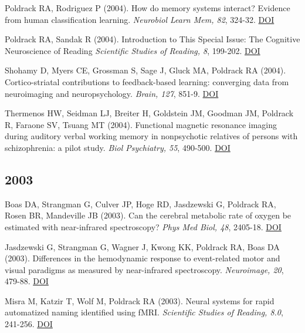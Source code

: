 \documentclass[10pt, letterpaper]{article}
\begin{document}
Poldrack RA, Rodriguez P (2004). How do memory systems interact? Evidence from human classification learning. \textit{Neurobiol Learn Mem, 82}, 324-32. \href{http://dx.doi.org/10.1016/j.nlm.2004.05.003}{DOI} \vspace{2mm}

Poldrack RA, Sandak R (2004). Introduction to This Special Issue: The Cognitive Neuroscience of Reading \textit{Scientific Studies of Reading, 8}, 199-202. \href{http://dx.doi.org/10.1207/s1532799xssr0803_1}{DOI} \vspace{2mm}

Shohamy D, Myers CE, Grossman S, Sage J, Gluck MA, Poldrack RA (2004). Cortico-striatal contributions to feedback-based learning: converging data from neuroimaging and neuropsychology. \textit{Brain, 127}, 851-9. \href{http://dx.doi.org/10.1093/brain/awh100}{DOI} \vspace{2mm}

Thermenos HW, Seidman LJ, Breiter H, Goldstein JM, Goodman JM, Poldrack R, Faraone SV, Tsuang MT (2004). Functional magnetic resonance imaging during auditory verbal working memory in nonpsychotic relatives of persons with schizophrenia: a pilot study. \textit{Biol Psychiatry, 55}, 490-500. \href{http://dx.doi.org/10.1016/j.biopsych.2003.11.014}{DOI} \vspace{2mm}

\subsection*{2003}Boas DA, Strangman G, Culver JP, Hoge RD, Jasdzewski G, Poldrack RA, Rosen BR, Mandeville JB (2003). Can the cerebral metabolic rate of oxygen be estimated with near-infrared spectroscopy? \textit{Phys Med Biol, 48}, 2405-18. \href{http://dx.doi.org/10.1088/0031-9155/48/15/311}{DOI} \vspace{2mm}

Jasdzewski G, Strangman G, Wagner J, Kwong KK, Poldrack RA, Boas DA (2003). Differences in the hemodynamic response to event-related motor and visual paradigms as measured by near-infrared spectroscopy. \textit{Neuroimage, 20}, 479-88. \href{http://dx.doi.org/10.1016/s1053-8119(03)00311-2}{DOI} \vspace{2mm}

Misra M, Katzir T, Wolf M, Poldrack RA (2003). Neural systems for rapid automatized naming identified using fMRI. \textit{Scientific Studies of Reading, 8.0}, 241-256. \href{http://dx.doi.org/None}{DOI} \vspace{2mm}
\end{document}
